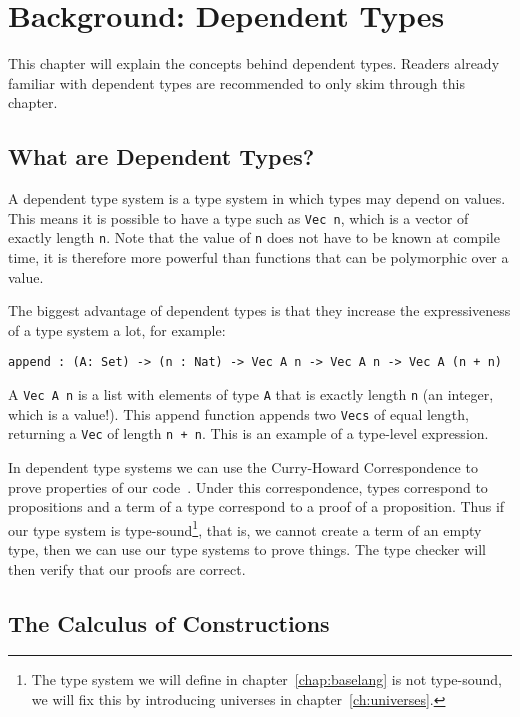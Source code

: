 \chapter{\label{chap:bg-dp}Background: Dependent Types}

This chapter will explain the concepts behind dependent types. Readers already familiar with dependent types are recommended to only skim through this chapter.

\section{What are Dependent Types?}

A dependent type system is a type system in which types may depend on values. This means it is possible to have a type such as \verb|Vec n|, which is a vector of exactly length \verb|n|. Note that the value of \verb|n| does not have to be known at compile time, it is therefore more powerful than functions that can be polymorphic over a value.

The biggest advantage of dependent types is that they increase the expressiveness of a type system a lot, for example:
\begin{lstlisting}
append : (A: Set) -> (n : Nat) -> Vec A n -> Vec A n -> Vec A (n + n)
\end{lstlisting}
A \verb|Vec A n| is a list with elements of type \verb|A| that is exactly length \verb|n| (an integer, which is a value!). This append function appends two \verb|Vecs| of equal length, returning a \verb|Vec| of length \verb|n + n|. This is an example of a type-level expression.

In dependent type systems we can use the Curry-Howard Correspondence to prove properties of our code~\cite{chc}. Under this correspondence, types correspond to propositions and a term of a type correspond to a proof of a proposition. Thus if our type system is type-sound\footnote{The type system we will define in chapter~\ref{chap:baselang} is not type-sound, we will fix this by introducing universes in chapter~\ref{ch:universes}.}, that is, we cannot create a term of an empty type, then we can use our type systems to prove things. The type checker will then verify that our proofs are correct.

\section{The Calculus of Constructions}

